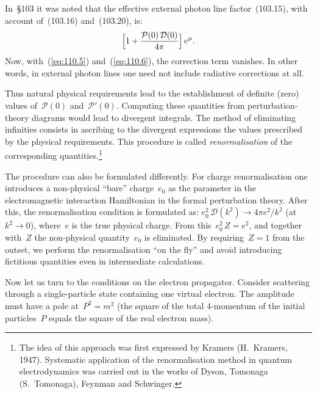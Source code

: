 In~\S103 it was noted that the effective external photon line factor~(103.15), with account of~(103.16) and~(103.20), is:
\[
\Bigl[1 + \frac{\mathcal{P}(0)\,\mathcal{D}(0)}{4\pi}\Bigr]\,e^\mu.
\]
Now, with~(\ref{eq:110.5}) and~(\ref{eq:110.6}), the correction term vanishes. In other words, in external photon lines one need not include radiative corrections at all.

Thus natural physical requirements lead to the establishment of definite (zero) values of~$\mathcal{P}(0)$ and~$\mathcal{P}'(0)$. Computing these quantities from perturbation-theory diagrams would lead to divergent integrals. The method of eliminating infinities consists in ascribing to the divergent expressions the values prescribed by the physical requirements. This procedure is called \emph{renormalisation} of the corresponding quantities.\footnote{The idea of this approach was first expressed by Kramers (H.~Kramers, 1947). Systematic application of the renormalisation method in quantum electrodynamics was carried out in the works of Dyson, Tomonaga (S.~Tomonaga), Feynman and Schwinger.}


The procedure can also be formulated differently. For charge renormalisation one introduces a non-physical ``bare'' charge~$e_0$ as the parameter in the electromagnetic interaction Hamiltonian in the formal perturbation theory. After this, the renormalisation condition is formulated as: $e_0^2\,\mathcal{D}(k^2) \to 4\pi e^2/k^2$ (at~$k^2 \to 0$), where~$e$ is the true physical charge. From this~$e_0^2\,Z = e^2$, and together with~$Z$ the non-physical quantity~$e_0$ is eliminated. By requiring~$Z = 1$ from the outset, we perform the renormalisation ``on the fly'' and avoid introducing fictitious quantities even in intermediate calculations.

Now let us turn to the conditions on the electron propagator. Consider scattering through a single-particle state containing one virtual electron. The amplitude must have a pole at~$P^2 = m^2$ (the square of the total 4-momentum of the initial particles~$P$ equals the square of the real electron mass).

